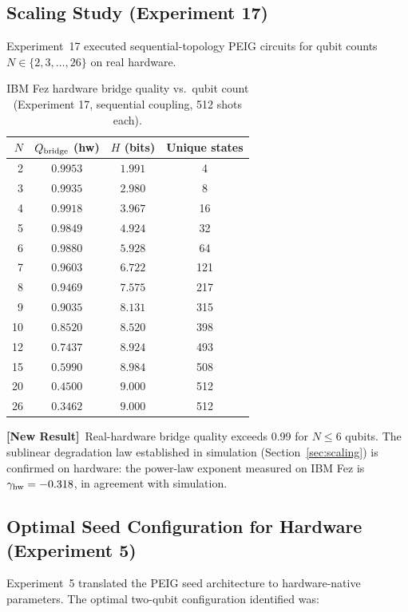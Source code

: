 \documentclass[12pt]{article}
\newcommand{\newresult}{\textbf{[New Result]}}
\begin{document}
\subsection{Scaling Study (Experiment 17)}

Experiment~17 executed sequential-topology PEIG circuits for qubit counts
$N \in \{2, 3, \ldots, 26\}$ on real hardware.

\begin{table}[H]
\centering
\caption{IBM Fez hardware bridge quality vs.\ qubit count (Experiment 17,
  sequential coupling, 512 shots each).}
\label{tab:hw_scaling}
\begin{tabular}{rccc}
\toprule
$N$ & $Q_{\rm bridge}$ (hw) & $H$ (bits) & Unique states\\
\midrule
2  & $0.9953$ & $1.991$ & 4\\
3  & $0.9935$ & $2.980$ & 8\\
4  & $0.9918$ & $3.967$ & 16\\
5  & $0.9849$ & $4.924$ & 32\\
6  & $0.9880$ & $5.928$ & 64\\
7  & $0.9603$ & $6.722$ & 121\\
8  & $0.9469$ & $7.575$ & 217\\
9  & $0.9035$ & $8.131$ & 315\\
10 & $0.8520$ & $8.520$ & 398\\
12 & $0.7437$ & $8.924$ & 493\\
15 & $0.5990$ & $8.984$ & 508\\
20 & $0.4500$ & $9.000$ & 512\\
26 & $0.3462$ & $9.000$ & 512\\
\bottomrule
\end{tabular}
\end{table}

\newresult\ Real-hardware bridge quality exceeds 0.99 for $N \leq 6$
qubits.  The sublinear degradation law established in simulation
(Section~\ref{sec:scaling}) is confirmed on hardware: the power-law
exponent measured on IBM Fez is $\gamma_{\rm hw} = -0.318$, in
agreement with simulation.

\subsection{Optimal Seed Configuration for Hardware (Experiment 5)}

Experiment~5 translated the PEIG seed architecture to hardware-native
parameters.  The optimal two-qubit configuration identified was:
\end{document}
